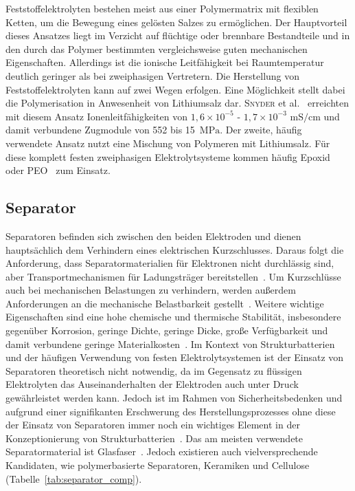 Feststoffelektrolyten bestehen meist aus einer Polymermatrix mit flexiblen Ketten, um die Bewegung eines gelösten Salzes zu ermöglichen. Der Hauptvorteil dieses Ansatzes liegt im Verzicht auf flüchtige oder brennbare Bestandteile und in den durch das Polymer bestimmten vergleichsweise guten mechanischen Eigenschaften. Allerdings ist die ionische Leitfähigkeit bei Raumtemperatur deutlich geringer als bei zweiphasigen Vertretern. Die Herstellung von Feststoffelektrolyten kann auf zwei Wegen erfolgen. Eine Möglichkeit stellt dabei die Polymerisation in Anwesenheit von Lithiumsalz dar. \textsc{Snyder} et al.~\cite{Snyder2007, Snyder2009} erreichten mit diesem Ansatz Ionenleitfähigkeiten von $1,6 \times 10^{-5}$ - $1,7 \times 10^{-3}$ $\si{\milli \siemens \per \cm}$ und damit verbundene Zugmodule von 552 bis 15~$\si{\MPa}$. Der zweite, häufig verwendete Ansatz nutzt eine Mischung von Polymeren mit Lithiumsalz. Für diese komplett festen zweiphasigen Elektrolytsysteme kommen häufig Epoxid~\cite{Matsumoto2011,Munoz2021,Wang2020b} oder PEO~\cite{Moreno2011,Ji2010,Guo2021} zum Einsatz.

\subsection{Separator}

Separatoren befinden sich zwischen den beiden Elektroden und dienen hauptsächlich dem Verhindern eines elektrischen Kurzschlusses. Daraus folgt die Anforderung, dass Separatormaterialien für Elektronen nicht durchlässig sind, aber Transportmechanismen für Ladungsträger bereitstellen~\cite{Kurzweil2015}. Um Kurzschlüsse auch bei mechanischen Belastungen zu verhindern, werden außerdem Anforderungen an die mechanische Belastbarkeit gestellt~\cite{Asp2015}. Weitere wichtige Eigenschaften sind eine hohe chemische und thermische Stabilität, insbesondere gegenüber Korrosion, geringe Dichte, geringe Dicke, große Verfügbarkeit und damit verbundene geringe Materialkosten~\cite{Beard2019}. Im Kontext von Strukturbatterien und der häufigen Verwendung von festen Elektrolytsystemen ist der Einsatz von Separatoren theoretisch nicht notwendig, da im Gegensatz zu flüssigen Elektrolyten das Auseinanderhalten der Elektroden auch unter Druck gewährleistet werden kann. Jedoch ist im Rahmen von Sicherheitsbedenken und aufgrund einer signifikanten Erschwerung des Herstellungsprozesses ohne diese der Einsatz von Separatoren immer noch ein wichtiges Element in der Konzeptionierung von Strukturbatterien~\cite{Asp2015, Hubert2022}. Das am meisten verwendete Separatormaterial ist Glasfaser~\cite{Zhou2022}. Jedoch existieren auch vielversprechende Kandidaten, wie polymerbasierte Separatoren, Keramiken und Cellulose~\cite{Simon2008, Greenhalgh2023, Chaudhary2024a} (Tabelle~\ref{tab:separator_comp}).

